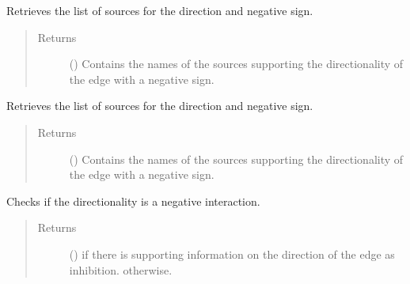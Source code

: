 \documentclass[letterpaper,10pt,english]{sphinxmanual}
\begin{document}
\begin{fulllineitems}
\begin{fulllineitems}
\end{fulllineitems}


\begin{fulllineitems}
\label{\detokenize{main:pypath.main.Direction.negative_sources_reverse}}
Retrieves the list of sources for the 
direction and negative sign.
\begin{quote}\begin{description}
\item[{Returns}] \leavevmode
() \textendash{} Contains the names of the sources supporting the
 directionality of the edge with a
negative sign.

\end{description}\end{quote}

\end{fulllineitems}


\begin{fulllineitems}
\label{\detokenize{main:pypath.main.Direction.negative_sources_straight}}
Retrieves the list of sources for the 
direction and negative sign.
\begin{quote}\begin{description}
\item[{Returns}] \leavevmode
() \textendash{} Contains the names of the sources supporting the
 directionality of the edge with a
negative sign.

\end{description}\end{quote}

\end{fulllineitems}


\begin{fulllineitems}
\label{\detokenize{main:pypath.main.Direction.negative_straight}}
Checks if the  directionality is a negative
interaction.
\begin{quote}\begin{description}
\item[{Returns}] \leavevmode
() \textendash{}  if there is supporting information on
the  direction of the edge as inhibition.
 otherwise.


\end{description}
\end{quote}
\end{fulllineitems}
\end{fulllineitems}
\end{document}
